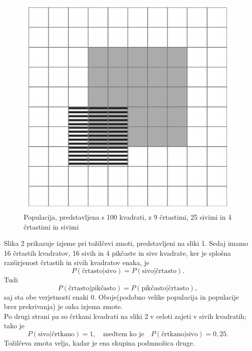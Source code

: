 \documentclass[12pt,a4paper]{amsart}
\theoremstyle{definition} %
\theoremstyle{plain} %
\begin{document}
\begin{figure}[!ht]\label{fig:slika1}
    \centering
    \includegraphics[scale=0.45]{slika1.png}
    \caption{Populacija, predstavljena s 100 kvadrati, z 9 črtastimi, 25 sivimi in 4 črtastimi in sivimi}\vspace{2mm}
 \end{figure}

 Slika 2 prikazuje izjeme pri tožilčevi zmoti, predstavljeni na sliki 1. Sedaj imamo 16 črtastih kvadratov, 16 sivih in 4 pikčaste in sive kvadrate, ker je splošna 
 razširjenost črtastih in sivih kvadratov enaka, je
 \[ P(\text{črtasto} \lvert \text{sivo}) = P(\text{sivo} \lvert \text{črtasto}).\]
Tudi 
\[P(\text{črtasto} \lvert \text{pikčasto}) = P(\text{pikčasto} \lvert \text{črtasto}),\]
saj sta obe verjetnosti enaki $0$. Oboje(podobno velike populacija in populacije brez prekrivanja) je ozka izjema zmote. \\
Po drugi strani pa so črtkani kvadrati na sliki 2 v celoti zajeti v sivih kvadratih; tako je 
\[P(\text{sivo} \lvert \text{črtkano}) = 1, \quad \text{medtem ko je} \quad P(\text{črtkano} \lvert \text{sivo}) = 0,25. \]
Tožilčeva zmota velja, kadar je ena skupina podmnožica druge.
\end{document}
